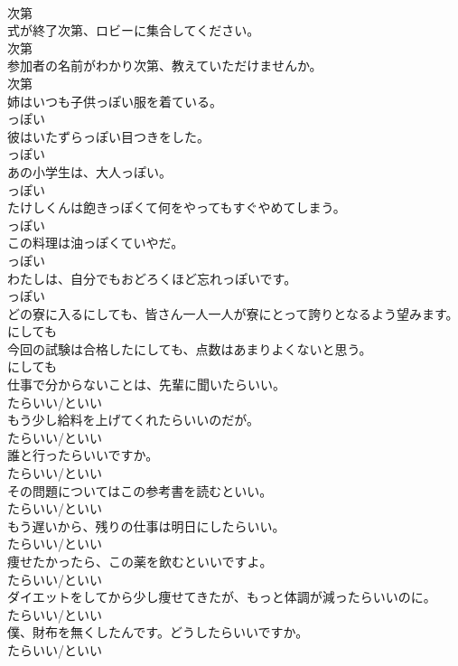 \documentclass[8pt]{extreport}
\begin{document}
\begin{CJK}{UTF8}{min}
\\	次第
\\	式が終了次第、ロビーに集合してください。	
\\	次第
\\	参加者の名前がわかり次第、教えていただけませんか。	
\\	次第
\\	姉はいつも子供っぽい服を着ている。	
\\	っぽい
\\	彼はいたずらっぽい目つきをした。	
\\	っぽい
\\	あの小学生は、大人っぽい。	
\\	っぽい
\\	たけしくんは飽きっぽくて何をやってもすぐやめてしまう。	
\\	っぽい
\\	この料理は油っぽくていやだ。	
\\	っぽい
\\	わたしは、自分でもおどろくほど忘れっぽいです。	
\\	っぽい
\\	どの寮に入るにしても、皆さん一人一人が寮にとって誇りとなるよう望みます。	
\\	にしても
\\	今回の試験は合格したにしても、点数はあまりよくないと思う。	
\\	にしても
\\	仕事で分からないことは、先輩に聞いたらいい。	
\\	たらいい/といい
\\	もう少し給料を上げてくれたらいいのだが。	
\\	たらいい/といい
\\	誰と行ったらいいですか。	
\\	たらいい/といい
\\	その問題についてはこの参考書を読むといい。	
\\	たらいい/といい
\\	もう遅いから、残りの仕事は明日にしたらいい。	
\\	たらいい/といい
\\	痩せたかったら、この薬を飲むといいですよ。	
\\	たらいい/といい
\\	ダイエットをしてから少し痩せてきたが、もっと体調が減ったらいいのに。	
\\	たらいい/といい
\\	僕、財布を無くしたんです。どうしたらいいですか。	
\\	たらいい/といい

\end{CJK}
\end{document}
